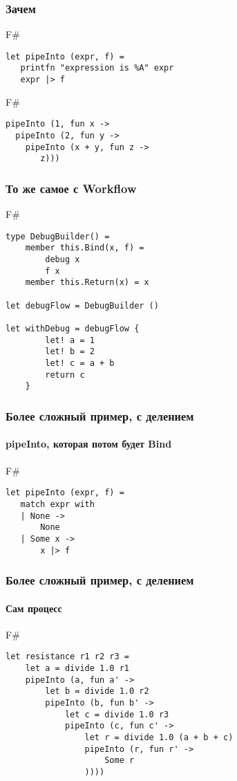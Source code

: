 \documentclass[xetex,mathserif,serif]{beamer}
\begin{document}
	\begin{frame}[fragile]
		\frametitle{Зачем}
		\begin{exampleblock}{F\#}
			\begin{verbatim}
let pipeInto (expr, f) =
   printfn "expression is %A" expr 
   expr |> f 
			\end{verbatim}
		\end{exampleblock}
		\begin{exampleblock}{F\#}
			\begin{verbatim}
pipeInto (1, fun x ->
  pipeInto (2, fun y -> 
    pipeInto (x + y, fun z -> 
       z)))
			\end{verbatim}
		\end{exampleblock}
\end{frame}

	\begin{frame}[fragile]
		\frametitle{То же самое с Workflow}
		\begin{exampleblock}{F\#}
			\begin{verbatim}
type DebugBuilder() =
    member this.Bind(x, f) = 
        debug x 
        f x
    member this.Return(x) = x

let debugFlow = DebugBuilder ()

let withDebug = debugFlow {
        let! a = 1
        let! b = 2
        let! c = a + b
        return c
    }
			\end{verbatim}
		\end{exampleblock}
\end{frame}

	\begin{frame}[fragile]
		\frametitle{Более сложный пример, с делением}
		\framesubtitle{pipeInto, которая потом будет Bind}
		\begin{exampleblock}{F\#}
			\begin{verbatim}
let pipeInto (expr, f) =
   match expr with
   | None -> 
       None
   | Some x -> 
       x |> f
			\end{verbatim}
		\end{exampleblock}
\end{frame}

	\begin{frame}[fragile]
		\frametitle{Более сложный пример, с делением}
		\framesubtitle{Сам процесс}
		\begin{exampleblock}{F\#}
			\begin{verbatim}
let resistance r1 r2 r3 = 
    let a = divide 1.0 r1
    pipeInto (a, fun a' ->
        let b = divide 1.0 r2
        pipeInto (b, fun b' ->
            let c = divide 1.0 r3
            pipeInto (c, fun c' ->
                let r = divide 1.0 (a + b + c)
                pipeInto (r, fun r' ->
                    Some r
                ))))
			\end{verbatim}
		\end{exampleblock}
\end{frame}
\end{document}
